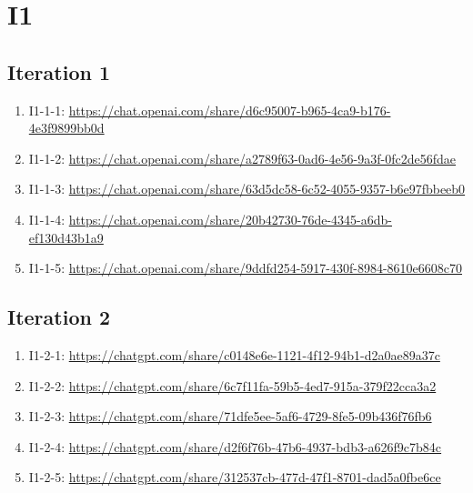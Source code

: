 \section{I1\label{I1-1}}

\subsection{Iteration 1}

\begin{enumerate}
    \item I1-1-1: \href{https://chat.openai.com/share/d6c95007-b965-4ca9-b176-4e3f9899bb0d}{https://chat.openai.com/share/d6c95007-b965-4ca9-b176-4e3f9899bb0d}
    \item I1-1-2: \href{https://chat.openai.com/share/a2789f63-0ad6-4e56-9a3f-0fc2de56fdae}{https://chat.openai.com/share/a2789f63-0ad6-4e56-9a3f-0fc2de56fdae}
    \item I1-1-3: \href{https://chat.openai.com/share/63d5dc58-6c52-4055-9357-b6e97fbbeeb0}{https://chat.openai.com/share/63d5dc58-6c52-4055-9357-b6e97fbbeeb0}
    \item I1-1-4: \href{https://chat.openai.com/share/20b42730-76de-4345-a6db-ef130d43b1a9}{https://chat.openai.com/share/20b42730-76de-4345-a6db-ef130d43b1a9}
    \item I1-1-5: \href{https://chat.openai.com/share/9ddfd254-5917-430f-8984-8610e6608c70}{https://chat.openai.com/share/9ddfd254-5917-430f-8984-8610e6608c70}
\end{enumerate}

\subsection{Iteration 2}

\begin{enumerate}
    \item I1-2-1: \href{https://chatgpt.com/share/c0148e6e-1121-4f12-94b1-d2a0ae89a37c}{https://chatgpt.com/share/c0148e6e-1121-4f12-94b1-d2a0ae89a37c}
    \item I1-2-2: \href{https://chatgpt.com/share/6c7f11fa-59b5-4ed7-915a-379f22cca3a2}{https://chatgpt.com/share/6c7f11fa-59b5-4ed7-915a-379f22cca3a2}
    \item I1-2-3: \href{https://chatgpt.com/share/71dfe5ee-5af6-4729-8fe5-09b436f76fb6}{https://chatgpt.com/share/71dfe5ee-5af6-4729-8fe5-09b436f76fb6}
    \item I1-2-4: \href{https://chatgpt.com/share/d2f6f76b-47b6-4937-bdb3-a626f9c7b84c}{https://chatgpt.com/share/d2f6f76b-47b6-4937-bdb3-a626f9c7b84c}
    \item I1-2-5: \href{https://chatgpt.com/share/312537cb-477d-47f1-8701-dad5a0fbe6ce}{https://chatgpt.com/share/312537cb-477d-47f1-8701-dad5a0fbe6ce}
\end{enumerate}